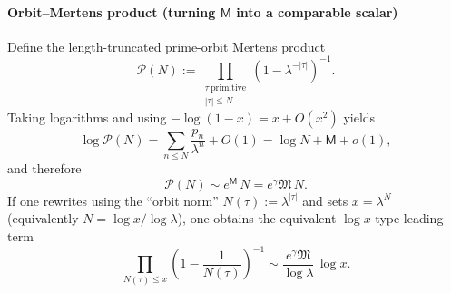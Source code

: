 \paragraph{Orbit--Mertens product (turning $\mathsf{M}$ into a comparable scalar)}
Define the length-truncated prime-orbit Mertens product
\[
\mathcal{P}(N):=\prod_{\substack{\tau\ \mathrm{primitive}\\|\tau|\le N}}\left(1-\lambda^{-|\tau|}\right)^{-1}.
\]
Taking logarithms and using $-\log(1-x)=x+O(x^2)$ yields
\[
\log\mathcal{P}(N)=\sum_{n\le N}\frac{p_n}{\lambda^n}+O(1)
=\log N+\mathsf{M}+o(1),
\]
and therefore
\[
\mathcal{P}(N)\sim e^{\mathsf{M}}\,N=e^{\gamma}\mathfrak{M}\,N.
\]
If one rewrites using the ``orbit norm'' $N(\tau):=\lambda^{|\tau|}$ and sets $x=\lambda^N$ (equivalently $N=\log x/\log\lambda$), one obtains the equivalent $\log x$-type leading term
\[
\prod_{N(\tau)\le x}\left(1-\frac{1}{N(\tau)}\right)^{-1}
\sim \frac{e^{\gamma}\mathfrak{M}}{\log\lambda}\,\log x.
\]


